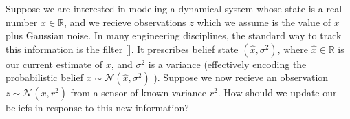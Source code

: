 \begin{example}
	\label{ex:kalman1d}
\def\estx{\hat{x}}
Suppose we are interested in modeling a
dynamical system whose state is a real number
$x \in \mathbb R$, and we recieve observations
$z$ which we assume is the value of $x$
plus Gaussian noise.
In many engineering disciplines, the
 standard way to track this information is
the \citeauthor{kalman1960new} filter [\citeyear{kalman1960new}].
It prescribes belief state $(\estx, \sigma^2)$,
where $\estx \in \mathbb R$ is our current estimate of
$x$, and
$\sigma^2$ is a variance
(effectively encoding the probabilistic belief
$x \sim \mathcal N(\estx, \sigma^2)$
).
%
Suppose we now recieve an observation
$z \sim \mathcal N(x, r^2)$ from a sensor of known variance $r^2$.
How should we update our beliefs in response
to this new information?


\end{example}
